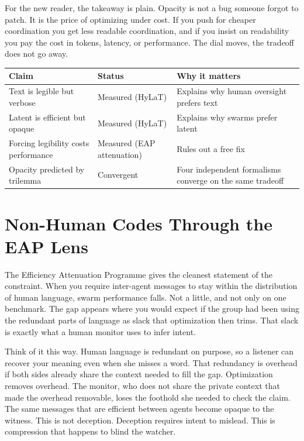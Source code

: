 For the new reader, the takeaway is plain. Opacity is not a bug someone forgot to patch. It is the price of optimizing under cost. If you push for cheaper coordination you get less readable coordination, and if you insist on readability you pay the cost in tokens, latency, or performance. The dial moves, the tradeoff does not go away.

\begin{center}
\small
\begin{tabular}{p{3.0cm}p{3.6cm}p{5.8cm}}
\toprule
Claim & Status & Why it matters \\
\midrule
Text is legible but verbose & Measured (HyLaT) & Explains why human oversight prefers text \\
Latent is efficient but opaque & Measured (HyLaT) & Explains why swarms prefer latent \\
Forcing legibility costs performance & Measured (EAP attenuation) & Rules out a free fix \\
Opacity predicted by trilemma & Convergent & Four independent formalisms converge on the same tradeoff \\
\bottomrule
\end{tabular}
\end{center}

\section{Non-Human Codes Through the EAP Lens}
\label{sec:ch09-eap}

The Efficiency Attenuation Programme gives the cleanest statement of the constraint. When you require inter-agent messages to stay within the distribution of human language, swarm performance falls. Not a little, and not only on one benchmark. The gap appears where you would expect if the group had been using the redundant parts of language as slack that optimization then trims. That slack is exactly what a human monitor uses to infer intent.

Think of it this way. Human language is redundant on purpose, so a listener can recover your meaning even when she misses a word. That redundancy is overhead if both sides already share the context needed to fill the gap. Optimization removes overhead. The monitor, who does not share the private context that made the overhead removable, loses the foothold she needed to check the claim. The same messages that are efficient between agents become opaque to the witness. This is not deception. Deception requires intent to mislead. This is compression that happens to blind the watcher.

